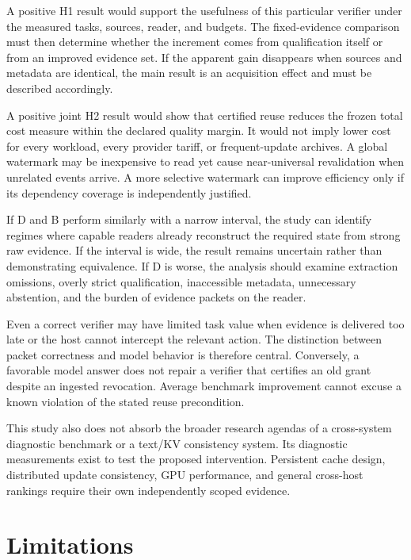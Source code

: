A positive H1 result would support the usefulness of this particular
verifier under the measured tasks, sources, reader, and budgets. The
fixed-evidence comparison must then determine whether the increment
comes from qualification itself or from an improved evidence set. If the
apparent gain disappears when sources and metadata are identical, the
main result is an acquisition effect and must be described accordingly.

A positive joint H2 result would show that certified reuse reduces the
frozen total cost measure within the declared quality margin. It would
not imply lower cost for every workload, every provider tariff, or
frequent-update archives. A global watermark may be inexpensive to read
yet cause near-universal revalidation when unrelated events arrive. A
more selective watermark can improve efficiency only if its dependency
coverage is independently justified.

If D and B perform similarly with a narrow interval, the study can
identify regimes where capable readers already reconstruct the required
state from strong raw evidence. If the interval is wide, the result
remains uncertain rather than demonstrating equivalence. If D is worse,
the analysis should examine extraction omissions, overly strict
qualification, inaccessible metadata, unnecessary abstention, and the
burden of evidence packets on the reader.

Even a correct verifier may have limited task value when evidence is
delivered too late or the host cannot intercept the relevant action. The
distinction between packet correctness and model behavior is therefore
central. Conversely, a favorable model answer does not repair a verifier
that certifies an old grant despite an ingested revocation. Average
benchmark improvement cannot excuse a known violation of the stated
reuse precondition.

This study also does not absorb the broader research agendas of a
cross-system diagnostic benchmark or a text/KV consistency system. Its
diagnostic measurements exist to test the proposed intervention.
Persistent cache design, distributed update consistency, GPU
performance, and general cross-host rankings require their own
independently scoped evidence.

\section{Limitations}\label{limitations}

